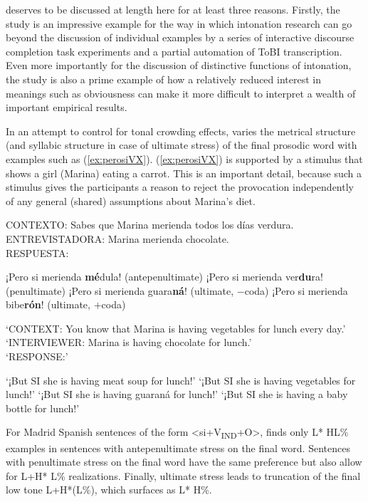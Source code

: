 \citet{ElviraGarcia.2016} deserves to be discussed at length here for at least three reasons. Firstly, the study is an impressive example for the way in which intonation research can go beyond the discussion of individual examples by a series of interactive discourse completion task experiments and a partial automation of ToBI transcription. Even more importantly for the discussion of distinctive functions of intonation, the study is also a prime example of how a relatively reduced interest in meanings such as obviousness can make it more difficult to interpret a wealth of important empirical results.

In an attempt to control for tonal crowding effects, \citet[54--56]{ElviraGarcia.2016} varies the metrical structure (and syllabic structure in case of ultimate stress) of the final prosodic word with examples such as (\ref{ex:perosiVX}). (\ref{ex:perosiVX}) is supported by a stimulus that shows a girl (Marina) eating a carrot. This is an important detail, because such a stimulus gives the participants a reason to reject the provocation independently of any general (shared) assumptions about Marina's diet.

\begin{exe}
	\ex  \label{ex:perosiVX}  CONTEXTO: Sabes que Marina merienda todos los días verdura.\\
	ENTREVISTADORA: Marina merienda chocolate.\\
	RESPUESTA:
	\begin{xlist}
		\ex ¡Pero si merienda \textbf{mé}dula! (antepenultimate) 
		\ex ¡Pero si merienda ver\textbf{du}ra! (penultimate) 
		\ex ¡Pero si merienda guara\textbf{ná}! (ultimate, $-$coda)
		\ex ¡Pero si merienda bibe\textbf{rón}! (ultimate, $+$coda)
	\end{xlist} 
	\glt `CONTEXT: You know that Marina is having vegetables for lunch every day.' \\
	`INTERVIEWER: Marina is having chocolate for lunch.'\\
	`RESPONSE:' 
	\begin{xlist}
		\ex `¡But SI she is having meat soup for lunch!' 
		\ex `¡But SI she is having vegetables for lunch!' 
		\ex `¡But SI she is having guaraná for lunch!' 
		\ex `¡But SI she is having a baby bottle for lunch!' 
	\end{xlist}
\end{exe}

For Madrid Spanish sentences of the form <si+V\textsubscript{IND}+O>, \citet[138--143]{ElviraGarcia.2016} finds only L* HL\% examples in sentences with antepenultimate stress on the final word. Sentences with penultimate stress on the final word have the same preference but also allow for L+H* L\% realizations. Finally, ultimate stress leads to truncation of the final low tone L+H*(L\%), which surfaces as L* H\%. 


